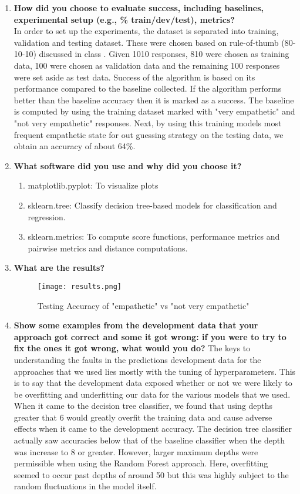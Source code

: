 \documentclass[5px]{report}
\begin{document}
\begin{enumerate}
\item \textbf{How did you choose to evaluate success, including baselines, experimental setup (e.g., \% train/dev/test), metrics?}\\
In order to set up the experiments, the dataset is separated into training, validation and testing dataset. These were chosen based on rule-of-thumb (80-10-10) discussed in class . Given 1010 responses, 810 were chosen as training data, 100 were chosen as validation data and the remaining 100 responses were set aside as test data. Success of the algorithm is based on its performance compared to the baseline collected. If the algorithm performs better than the baseline accuracy then it is marked as a success.
The baseline is computed by using the training dataset marked with "very empathetic" and "not very empathetic" responses. Next, by using this training models most frequent empathetic state for out guessing strategy on the testing data, we obtain an accuracy of about 64\%.

\item \textbf{What software did you use and why did you choose it?}
  \begin{enumerate}
     \item matplotlib.pyplot: To visualize plots
     \item sklearn.tree: Classify decision tree-based models for classification and regression.
     \item sklearn.metrics: To compute score functions, performance metrics and pairwise metrics and distance computations.
 \end{enumerate}

\item \textbf{What are the results?}
\begin{figure}[h]
  \centering
  \texttt{[image: results.png]}
  \caption{Testing Accuracy of "empathetic" vs "not very empathetic"}
  \label{f:myplotfig}
\end{figure}

\item \textbf{Show some examples from the development data that your approach got correct and some it got wrong: if you were to try to fix the ones it got wrong, what would you do?}
The keys to understanding the faults in the predictions development data for the approaches that we used lies mostly with the tuning of hyperparameters.  This is to say that the development data exposed whether or not we were likely to be overfitting and underfitting our data for the various models that we used.  When it came to the decision tree classifier, we found that using depths greater that 6 would greatly overfit the training data and cause adverse effects when it came to the development accuracy.   The decision tree classifier actually saw accuracies below that of the baseline classifier when the depth was increase to 8 or greater.  However, larger maximum depths were permissible when using the Random Forest approach.  Here, overfitting seemed to occur past depths of around 50 but this was highly subject to the random fluctuations in the model itself.
\end{enumerate}
\end{document}
